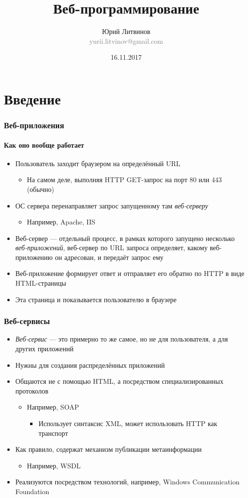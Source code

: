 \documentclass[xetex,mathserif,serif]{beamer}
\title{Веб-программирование}
\author[Юрий Литвинов]{Юрий Литвинов\\\small{\textcolor{gray}{yurii.litvinov@gmail.com}}}
\date{16.11.2017}
\begin{document}
	\frame{\titlepage}

	\section{Введение}

	\begin{frame}
		\frametitle{Веб-приложения}
		\framesubtitle{Как оно вообще работает}
		\begin{itemize}
			\item Пользователь заходит браузером на определённый URL
			\begin{itemize}
				\item На самом деле, выполняя HTTP GET-запрос на порт 80 или 443 (обычно)
			\end{itemize}
			\item ОС сервера перенаправляет запрос запущенному там \textit{веб-серверу}
			\begin{itemize}
				\item Например, Apache, IIS
			\end{itemize}
			\item Веб-сервер --- отдельный процесс, в рамках которого запущено несколько \textit{веб-приложений}, веб-сервер по URL запроса определяет, какому веб-приложению он адресован, и передаёт запрос ему
			\item Веб-приложение формирует ответ и отправляет его обратно по HTTP в виде HTML-страницы
			\item Эта страница и показывается пользователю в браузере
		\end{itemize}
	\end{frame}

	\begin{frame}
		\frametitle{Веб-сервисы}
		\begin{itemize}
			\item \textit{Веб-сервис} --- это примерно то же самое, но не для пользователя, а для других приложений
			\item Нужны для создания распределённых приложений
			\item Общаются не с помощью HTML, а посредством специализированных протоколов
			\begin{itemize}
				\item Например, SOAP 
				\begin{itemize}
					\item Использует синтаксис XML, может использовать HTTP как транспорт
				\end{itemize}
			\end{itemize}
			\item Как правило, содержат механизм публикации метаинформации
			\begin{itemize}
				\item Например, WSDL
			\end{itemize}
			\item Реализуются посредством технологий, например, Windows Communication Foundation
		\end{itemize}
	\end{frame}
\end{document}
